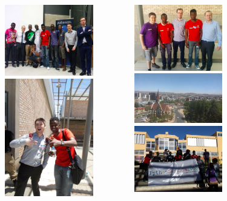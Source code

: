 \documentclass{beamer}
\begin{document}
\begin{frame}
  \begin{columns}[c]
    \begin{flushright}
    \tiny{
    \includegraphics[width=3.85cm]{Images/namibia2} \newline \newline
    \includegraphics[width=3.85cm]{Images/namibia4} \newline \newline}
  \end{flushright}
    \begin{flushleft}
    \tiny{
    \includegraphics[width=3.85cm]{Images/namibia1} \newline \newline
    \includegraphics[width=3.85cm]{Images/namibia6} \newline \newline
    \includegraphics[width=3.85cm]{Images/namibia5} \newline \newline}
  \end{flushleft}
  \end{columns}
\end{frame}
\end{document}
